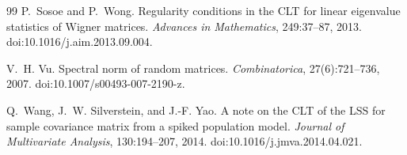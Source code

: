 \documentclass[11pt]{article}
\theoremstyle{definition}
\theoremstyle{remark}
\begin{document}
\begin{thebibliography}{99}
P.~Sosoe and P.~Wong.
\newblock Regularity conditions in the CLT for linear eigenvalue statistics of Wigner matrices.
\newblock \emph{Advances in Mathematics}, 249:37--87, 2013.
\newblock doi:10.1016/j.aim.2013.09.004.

V.~H. Vu.
\newblock Spectral norm of random matrices.
\newblock \emph{Combinatorica}, 27(6):721--736, 2007.
\newblock doi:10.1007/s00493-007-2190-z.

Q.~Wang, J.~W. Silverstein, and J.-F. Yao.
\newblock A note on the CLT of the LSS for sample covariance matrix from a spiked population model.
\newblock \emph{Journal of Multivariate Analysis}, 130:194--207, 2014.
\newblock doi:10.1016/j.jmva.2014.04.021.

\end{thebibliography}
\end{document}

